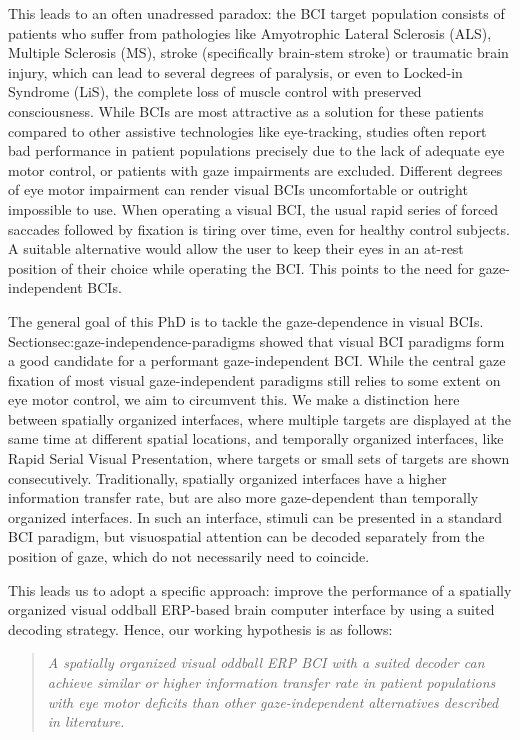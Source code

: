 This leads to an often unadressed paradox: the BCI target population consists
of patients who suffer from pathologies like Amyotrophic Lateral Sclerosis
(ALS), Multiple Sclerosis (MS), stroke (specifically
brain-stem stroke) or traumatic brain injury, which can lead to several degrees
of paralysis, or even to Locked-in Syndrome (LiS), the complete loss of muscle
control with preserved consciousness.
While BCIs are most attractive as a solution for these patients
compared to other assistive technologies like eye-tracking, studies often
report bad performance in patient populations precisely due to the lack of adequate eye motor
control, or patients with gaze impairments are excluded.
Different degrees of eye motor impairment can render visual BCIs
uncomfortable or outright impossible to use.
When operating a visual BCI, the usual rapid series of forced saccades followed
by fixation is tiring over time, even for healthy control subjects.
A suitable alternative would allow the user to keep their eyes in an at-rest
position of their choice while operating the BCI.
This points to the need for gaze-independent BCIs.

The general goal of this PhD is to tackle the gaze-dependence in visual BCIs.
Section{sec:gaze-independence-paradigms} showed that visual BCI paradigms form
a good candidate for a performant gaze-independent BCI.
While the central gaze fixation of most visual gaze-independent paradigms still
relies to some extent on eye motor control, we aim to circumvent this.
We make a distinction here between spatially organized interfaces, where
multiple targets are displayed at the same time at different spatial locations,
and temporally organized interfaces, like Rapid Serial Visual Presentation,
where targets or small sets of targets are shown consecutively.
Traditionally, spatially organized interfaces have a higher information transfer
rate, but are also more gaze-dependent than temporally organized interfaces.
In such an interface, stimuli can be presented in a standard BCI paradigm, but
visuospatial attention can be decoded separately from the position of gaze,
which do not necessarily need to coincide.

This leads us to adopt a specific approach: improve the performance of a
spatially organized visual oddball ERP-based brain
computer interface by using a suited decoding strategy.
Hence, our working hypothesis is as follows:
\begin{quote}
	\textit{A spatially organized visual oddball ERP BCI with a suited decoder
		can achieve similar or higher information transfer rate in patient
		populations with eye motor deficits than other
		gaze-independent alternatives described in literature.}
\end{quote}

